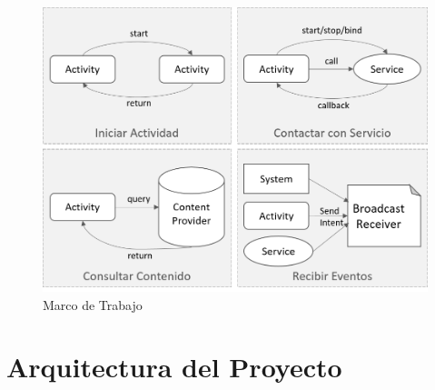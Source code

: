 \begin{figure}[H]
\begin{centering}
\includegraphics[width=1\columnwidth]{capitulo-5/graphics/mensajes_ipc}
\par\end{centering}
\caption[\emph{Framework Android}]{\label{fig5:mensajes-ipc}Marco de Trabajo }
\end{figure}


\section{Arquitectura del Proyecto}

